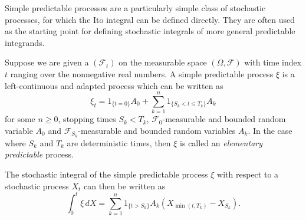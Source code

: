 \documentclass[12pt]{article}
\begin{document}
Simple predictable processes are a particularly simple class of stochastic processes, for which the Ito integral can be defined directly. They are often used as the starting point for defining stochastic integrals of more general predictable integrands.

Suppose we are given a  $(\mathcal{F}_t)$ on the measurable space $(\Omega,\mathcal{F})$ with time index $t$ ranging over the nonnegative real numbers.
A simple predictable process $\xi$ is a left-continuous and adapted process which can be written as
\begin{equation*}
\xi_t=1_{\{t=0\}}A_0+\sum_{k=1}^n1_{\{S_k<t\le T_k\}}A_k
\end{equation*}
for some $n\ge 0$, stopping times $S_k<T_k$, $\mathcal{F}_0$-measurable and bounded random variable $A_0$ and $\mathcal{F}_{S_k}$-measurable and bounded random variables $A_k$.
In the case where $S_k$ and $T_k$ are deterministic times, then $\xi$ is called an \emph{elementary predictable} process.

The stochastic integral of the simple predictable process $\xi$ with respect to a stochastic process $X_t$ can then be written as
\begin{equation*}
\int_0^t\xi\,dX = \sum_{k=1}^n1_{\{t>S_k\}}A_k(X_{\min(t,T_k)}-X_{S_k}).
\end{equation*}

\end{document}
